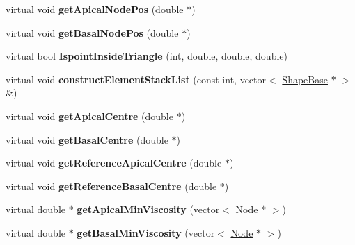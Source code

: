 \begin{DoxyCompactItemize}
\item 
\hypertarget{classShapeBase_ab60b476fb56d90a3b7fd9b13af4f5c32}{}virtual void {\bfseries get\+Apical\+Node\+Pos} (double $\ast$)\label{classShapeBase_ab60b476fb56d90a3b7fd9b13af4f5c32}

\item 
\hypertarget{classShapeBase_a8ec7f1e3c34a834ce5f76b20f4c15910}{}virtual void {\bfseries get\+Basal\+Node\+Pos} (double $\ast$)\label{classShapeBase_a8ec7f1e3c34a834ce5f76b20f4c15910}

\item 
\hypertarget{classShapeBase_a60e19fb23a181504a4eeda5a4267b89d}{}virtual bool {\bfseries Ispoint\+Inside\+Triangle} (int, double, double, double)\label{classShapeBase_a60e19fb23a181504a4eeda5a4267b89d}

\item 
\hypertarget{classShapeBase_a078cd384ddb67d188da518806394d73d}{}virtual void {\bfseries construct\+Element\+Stack\+List} (const int, vector$<$ \hyperlink{classShapeBase}{Shape\+Base} $\ast$ $>$ \&)\label{classShapeBase_a078cd384ddb67d188da518806394d73d}

\item 
\hypertarget{classShapeBase_a18458e707b8b44f63e51579fbe41c147}{}virtual void {\bfseries get\+Apical\+Centre} (double $\ast$)\label{classShapeBase_a18458e707b8b44f63e51579fbe41c147}

\item 
\hypertarget{classShapeBase_adde98255dadf5e0dcafccc2183d37dbe}{}virtual void {\bfseries get\+Basal\+Centre} (double $\ast$)\label{classShapeBase_adde98255dadf5e0dcafccc2183d37dbe}

\item 
\hypertarget{classShapeBase_aeb9484bea7718e49448ed3ef8a7867fd}{}virtual void {\bfseries get\+Reference\+Apical\+Centre} (double $\ast$)\label{classShapeBase_aeb9484bea7718e49448ed3ef8a7867fd}

\item 
\hypertarget{classShapeBase_a1f3cdb2306ce5848a7efe5af3890d630}{}virtual void {\bfseries get\+Reference\+Basal\+Centre} (double $\ast$)\label{classShapeBase_a1f3cdb2306ce5848a7efe5af3890d630}

\item 
\hypertarget{classShapeBase_a4cdee449e750c5a683f81088a195523f}{}virtual double $\ast$ {\bfseries get\+Apical\+Min\+Viscosity} (vector$<$ \hyperlink{classNode}{Node} $\ast$ $>$)\label{classShapeBase_a4cdee449e750c5a683f81088a195523f}

\item 
\hypertarget{classShapeBase_a16af853ecfeb1557e296f804cfe522f6}{}virtual double $\ast$ {\bfseries get\+Basal\+Min\+Viscosity} (vector$<$ \hyperlink{classNode}{Node} $\ast$ $>$)\label{classShapeBase_a16af853ecfeb1557e296f804cfe522f6}


\end{DoxyCompactItemize}
